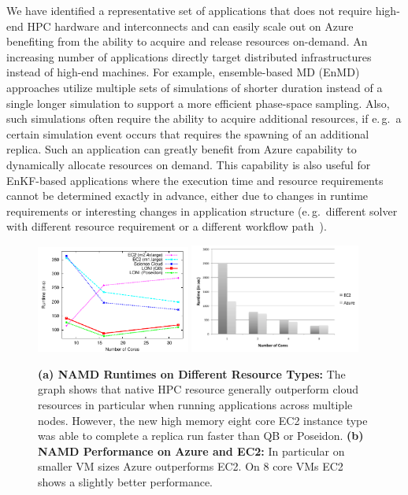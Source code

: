 \documentclass[3p,twocolumn]{elsarticle}
\begin{document}
We have identified a representative set of applications that does not
require high-end HPC hardware and interconnects and can easily scale
out on Azure benefiting from the ability to acquire and release
resources on-demand.  An increasing number of applications directly
target distributed infrastructures instead of high-end machines. For
example, ensemble-based MD (EnMD) approaches utilize multiple sets 
of simulations of shorter duration instead of a single longer simulation 
to support a more efficient phase-space sampling. Also, such simulations often
require the ability to acquire additional resources, if e.\,g.\ a
certain simulation event occurs that requires the spawning of an
additional replica.  Such an application can greatly benefit from
Azure capability to dynamically allocate resources on demand. This
capability is also useful for EnKF-based applications where the
execution time and resource requirements cannot be determined exactly
in advance, either due to changes in runtime requirements or
interesting changes in application structure (e.\,g.\ different solver
with different resource requirement or a different workflow
path~\cite{enkf_hybrid_grid_cloud}).



\begin{figure}[tbp]
  \centering
  \includegraphics[width=0.45\textwidth]{figures/namd_run.pdf}
  \label{tbd}
  \includegraphics[width=0.5\textwidth]{figures/namd_ec2_azure}
  \label{fig:perf_namd_ec2_azure}
  \caption{\textbf{(a) NAMD Runtimes on Different Resource Types: }
    The graph shows that native HPC resource generally outperform
    cloud resources in particular when running applications across
    multiple nodes. However, the new high memory eight core EC2
    instance type was able to complete a replica run faster than QB or
    Poseidon. \textbf{(b) NAMD Performance on Azure and EC2:} In particular on
    smaller VM sizes Azure outperforms EC2.  On 8 core VMs EC2 shows a
    slightly better performance.}
   \label{fig:performance_namd_run}
\end{figure}
\end{document}
